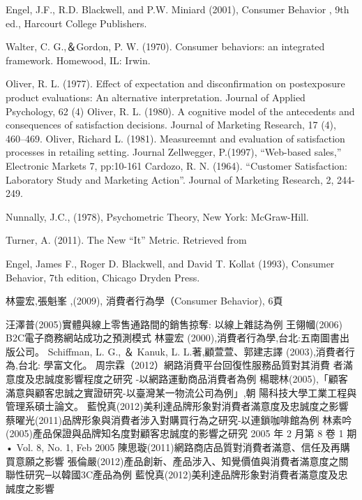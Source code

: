 \documentclass[a4paper,12pt]{report}
\begin{document}
\begin{thebibliography}{1}
Engel, J.F., R.D. Blackwell, and P.W. Miniard (2001), Consumer Behavior , 9th
ed., Harcourt College Publishers.

Walter, C. G.,＆Gordon, P. W. (1970). Consumer behaviors: an integrated framework. Homewood, IL: Irwin.

Oliver, R. L. (1977). Effect of expectation and disconfirmation on postexposure product
evaluations: An alternative interpretation. Journal of Applied Psychology, 62 (4)
Oliver, R. L. (1980). A cognitive model of the antecedents and consequences of satisfaction
decisions. Journal of Marketing Research, 17 (4), 460–469.
Oliver, Richard L. (1981). Measureemnt and evaluation of satisfaction processes in retailing setting. Journal
Zellwegger, P.(1997), “Web-based sales,” Electronic Markets 7, pp:10-161
Cardozo, R. N. (1964). “Customer Satisfaction: Laboratory Study and Marketing Action”. Journal of Marketing Research, 2, 244-249.

Nunnally, J.C., (1978), Psychometric Theory, New York: McGraw-Hill. 

Turner, A. (2011). The New “It” Metric. Retrieved from

Engel, James F., Roger D. Blackwell, and David T. Kollat (1993), Consumer
Behavior, 7th edition, Chicago Dryden Press.

林靈宏,張魁峯 ,(2009), 消費者行為學（Consumer Behavior), 6頁

汪澤普(2005)實體與線上零售通路間的銷售掠奪: 以線上雜誌為例
王翎幗(2006) B2C電子商務網站成功之預測模式
林靈宏 (2000),消費者行為學,台北:五南圖書出版公司。
Schiffman, L. G.,  ＆ Kanuk, L. L.著,顧萱萱、郭建志譯 (2003),消費者行為,台北: 學富文化。
周宗霖（2012）網路消費平台回復性服務品質對其消費 者滿意度及忠誠度影響程度之研究 -以網路運動商品消費者為例
楊聰林(2005),「顧客滿意與顧客忠誠之實證研究-以臺灣某一物流公司為例」,朝
  陽科技大學工業工程與管理系碩士論文。
藍悅真(2012)美利達品牌形象對消費者滿意度及忠誠度之影響
蔡曜光(2011)品牌形象與消費者涉入對購買行為之研究-以連鎖咖啡館為例
林素吟(2005)產品保證與品牌知名度對顧客忠誠度的影響之研究 2005 年 2 月第 8 卷 1 期 • Vol. 8, No. 1, Feb 2005
陳思璇(2011)網路商店品質對消費者滿意、信任及再購買意願之影響
張倫嚴(2012)產品創新、產品涉入、知覺價值與消費者滿意度之關聯性研究─以韓國3C產品為例
藍悅真(2012)美利達品牌形象對消費者滿意度及忠誠度之影響
\end{thebibliography}
\clearpage
\end{document}
